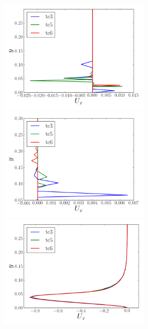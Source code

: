 \documentclass[12pt,oneside,a4paper]{article}
\begin{document}
\begin{figure}[!h]
\centering
\includegraphics[width=7.5cm]{images/CFD_meshIndependence/X1_Ux.png}\hfill \includegraphics[width=7.5cm]{images/CFD_meshIndependence/X2_Ux.png}\\
\includegraphics[width=7.5cm]{images/CFD_meshIndependence/X3_Ux.png}
\end{figure}
\end{document}

